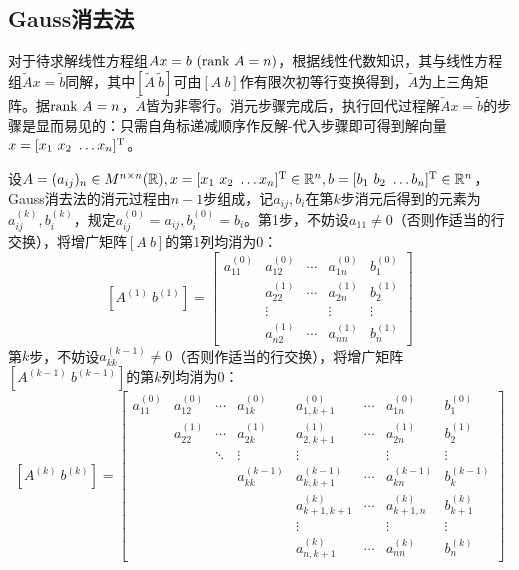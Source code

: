 \documentclass[UTF8,a4paper,10pt]{ctexart}
\begin{document}
        \subsection{Gauss消去法}
            \par    
            对于待求解线性方程组$Ax=b\ ({\rm rank}\ A=n)$，根据线性代数知识，其与线性方程组$\tilde{A}x=\tilde{b}$同解，其中$[\tilde{A}\ \tilde{b}]$可由$[A\ b]$作有限次初等行变换得到，$\tilde{A}$为上三角矩阵。据${\rm rank}\ A=n$，$\tilde{A}$皆为非零行。消元步骤完成后，执行回代过程解$\tilde{A}x=\tilde{b}$的步骤是显而易见的：只需自角标递减顺序作反解-代入步骤即可得到解向量$x=[x_1\ x_2\ \dots x_n]^{\rm T}$。
            \par
            设$A=(a_{ij})_n\in M^{n\times n}(\mathbb{R}),x=[x_1\ x_2\ \dots x_n]^{\rm T}\in \mathbb{R}^n,b=[b_1\ b_2\ \dots b_n]^{\rm T}\in \mathbb{R}^n$，Gauss消去法的消元过程由$n-1$步组成，记$a_{ij},b_i$在第$k$步消元后得到的元素为$a_{ij}^{(k)},b_i^{(k)}$，规定$a_{ij}^{(0)}=a_{ij},b_i^{(0)}=b_i$。第1步，不妨设$a_{11}\neq0$（否则作适当的行交换），将增广矩阵$[A\ b]$的第1列均消为0：
            $$
            [A^{(1)}\ b^{(1)}]=
                \begin{bmatrix}
                    a_{11}^{(0)} & a_{12}^{(0)} & \cdots & a_{1n}^{(0)} & b_1^{(0)} \\
                    \ & a_{22}^{(1)} & \cdots & a_{2n}^{(1)} & b_2^{(1)} \\
                    \ & \vdots & \ & \vdots & \vdots \\
                    \ & a_{n2}^{(1)} & \cdots & a_{nn}^{(1)} & b_n^{(1)}
                \end{bmatrix}
            $$
            第$k$步，不妨设$a_{kk}^{(k-1)}\neq0$（否则作适当的行交换），将增广矩阵$[A^{(k-1)}\ b^{(k-1)}]$的第$k$列均消为0：
            $$
            [A^{(k)}\ b^{(k)}]=
                \begin{bmatrix}
                    a_{11}^{(0)} & a_{12}^{(0)} & \cdots & a_{1k}^{(0)} & a_{1,k+1}^{(0)} & \cdots & a_{1n}^{(0)} & b_1^{(0)} \\
                    \ & a_{22}^{(1)} & \cdots & a_{2k}^{(1)} & a_{2,k+1}^{(1)} & \cdots & a_{2n}^{(1)} & b_2^{(1)} \\
                    \ & \ & \ddots & \vdots & \vdots & \ & \vdots & \vdots \\
                    \  & \  & \  & a_{kk}^{(k-1)}& a_{k,k+1}^{(k-1)} & \cdots & a_{kn}^{(k-1)} & b_k^{(k-1)} \\
                    \  & \  & \  & \  & a_{k+1,k+1}^{(k)} & \cdots & a_{k+1,n}^{(k)} & b_{k+1}^{(k)} \\
                    \  & \  & \  & \  & \vdots & \  & \vdots & \vdots \\
                    \  & \  & \  & \  & a_{n,k+1}^{(k)} & \cdots & a_{nn}^{(k)} & b_n^{(k)}
                \end{bmatrix}
            $$
\end{document}
